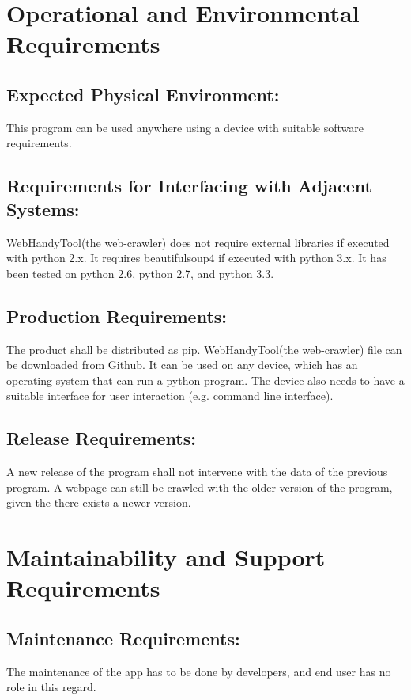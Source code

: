 \documentclass[titlepage]{article}
\begin{document}
\section{Operational and Environmental Requirements }

\subsection*{Expected Physical Environment:}
This program can be used anywhere using a device with suitable software requirements. 

\subsection*{Requirements for Interfacing with Adjacent Systems:}
WebHandyTool(the web-crawler) does not require external libraries if executed with python 2.x. It requires beautifulsoup4 if executed with python 3.x. It has been tested on python 2.6, python 2.7, and python 3.3.


\subsection*{Production Requirements:}

The product shall be distributed as pip. WebHandyTool(the web-crawler) file can be downloaded from Github. It can be used on any device, which has an operating system that can run a python program. The device also needs to have a suitable interface for user interaction (e.g. command line interface).


\subsection*{Release Requirements: }
A new release of the program shall not intervene with the data of the previous program. A webpage can still be crawled with the older version of the program, given the there exists a newer version.

\section{Maintainability and Support Requirements }

\subsection*{Maintenance Requirements:}
 The maintenance of the app has to be done by developers, and end user has no role in this regard.
\end{document}
